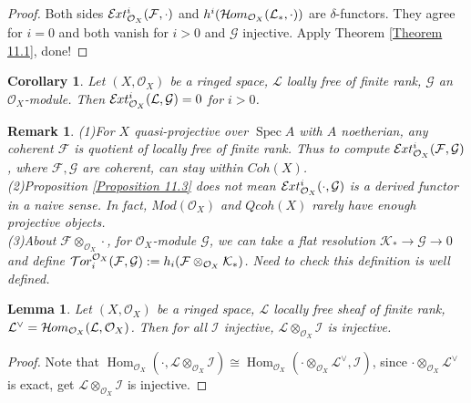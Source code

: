 \documentclass{ctexart}
\newtheorem{remark}{Remark}[section]
\newtheorem{lemma}{Lemma}[section]
\newtheorem{corollary}{Corollary}[section]
\renewcommand{\hom}{\operatorname{Hom}}
\newcommand{\sheafhom}{\mathcal{H}\kern -.5pt om}
\newcommand{\sheaftor}{\mathcal{T}\kern -.5pt or}
\newcommand{\sheafext}{\mathcal{E}\kern -.5pt xt}
\newcommand{\spec}{\operatorname{Spec}}
\begin{document}
\begin{proof}
    Both sides $\sheafext_{\mathcal{O}_{X}}^{i}(\mathcal{F}, \cdot)$ and $h^{i}(\sheafhom_{\mathcal{O}_{X}}(\mathcal{L}_{\ast}, \cdot))$ are $\delta$-functors.
    They agree for $i = 0$ and both vanish for $i > 0$ and $\mathcal{G}$ injective.
    Apply Theorem \ref{Theorem 11.1}, done!
\end{proof}
\begin{corollary}
    Let $(X, \mathcal{O}_{X})$ be a ringed space, $\mathcal{L}$ loally free of finite rank, $\mathcal{G}$ an $\mathcal{O}_{X}$-module.
    Then $\sheafext_{\mathcal{O}_{X}}^{i}(\mathcal{L}, \mathcal{G}) = 0$ for $i > 0$.
    \label{Corollary 11.1}
\end{corollary}
\begin{remark}
    (1)For $X$ quasi-projective over $\spec A$ with $A$ noetherian, any coherent $\mathcal{F}$ is quotient of locally free of finite rank.
    Thus to compute $\sheafext_{\mathcal{O}_{X}}^{i}(\mathcal{F}, \mathcal{G})$, where $\mathcal{F}, \mathcal{G}$ are coherent, can stay within $Coh(X)$. \\
    (2)Proposition \ref{Proposition 11.3} does not mean $\sheafext_{\mathcal{O}_{X}}^{i}(\cdot, \mathcal{G})$ is a derived functor in a naive sense.
    In fact, $Mod(\mathcal{O}_{X})$ and $Qcoh(X)$ rarely have enough projective objects. \\
    (3)About $\mathcal{F} \otimes_{\mathcal{O}_{X}} \cdot$, for $\mathcal{O}_{X}$-module $\mathcal{G}$, we can take a flat resolution $\mathcal{K}_{\ast} \longrightarrow \mathcal{G} \longrightarrow 0$ and define $\sheaftor_{i}^{\mathcal{O}_{X}}(\mathcal{F}, \mathcal{G}) := h_{i}(\mathcal{F} \otimes_{\mathcal{O}_{X}} \mathcal{K}_{\ast})$.
    Need to check this definition is well defined.
\end{remark}
\begin{lemma}
    Let $(X, \mathcal{O}_{X})$ be a ringed space, $\mathcal{L}$ locally free sheaf of finite rank, $\mathcal{L}^{\lor} = \sheafhom_{\mathcal{O}_{X}}(\mathcal{L}, \mathcal{O}_{X})$.
    Then for all $\mathcal{I}$ injective, $\mathcal{L} \otimes_{\mathcal{O}_{X}} \mathcal{I}$ is injective.
    \label{Lemma 11.2}
\end{lemma}
\begin{proof}
    Note that $\hom_{\mathcal{O}_{X}}(\cdot, \mathcal{L} \otimes_{\mathcal{O}_{X}} \mathcal{I}) \cong \hom_{\mathcal{O}_{X}}(\cdot \otimes_{\mathcal{O}_{X}} \mathcal{L}^{\lor}, \mathcal{I})$,
    since $\cdot \otimes_{\mathcal{O}_{X}} \mathcal{L}^{\lor}$ is exact, get $\mathcal{L} \otimes_{\mathcal{O}_{X}} \mathcal{I}$ is injective.
\end{proof}
\end{document}
